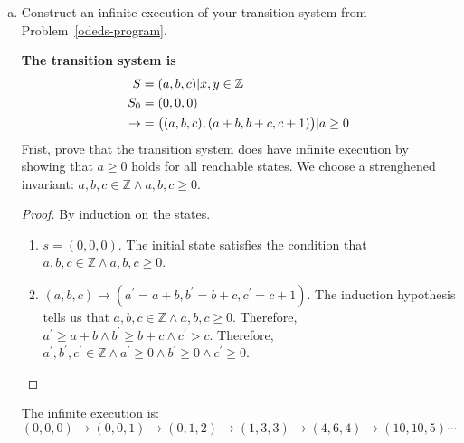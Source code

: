 \documentclass{article}
\begin{document}
\begin{enumerate}[leftmargin=*,itemindent=*,start=1,label={{\bf Problem \arabic*}.},ref=\arabic*]
\begin{enumerate}[(a)]
  \item Construct an infinite execution of your transition system from
    Problem~\ref{odeds-program}.

    \textbf{The transition system is}
    \begin{align*}
      S &= \set{(a,b,c) | x,y\in \mathbb{Z}}\\
      S_0 &= \set{(0, 0, 0)}\\
      \to &= \Set{\big((a,b,c),(a+b,b+c,c+1)\big) | a \geq 0}
    \end{align*}
    Frist, prove that the transition system does have infinite execution by showing that $a \geq 0$ holds for all reachable states. We choose a strenghened invariant: $a, b, c\in \mathbb{Z} \wedge a, b, c \geq 0$.
    \begin{proof}
      By induction on the states.
      \begin{enumerate}
        \item $s=(0, 0, 0)$. The initial state satisfies the condition that $a, b, c\in \mathbb{Z} \wedge a, b, c \geq 0$.
        \item $(a, b, c)\to (a^\prime=a+b, b^\prime=b+c, c^\prime=c+1)$. The induction hypothesis tells us that $a, b, c\in \mathbb{Z} \wedge a, b, c \geq 0$. Therefore, $a^\prime\geq a+b\wedge b^\prime\geq b+c \wedge c^\prime > c$. Therefore, $a^\prime, b^\prime, c^\prime \in \mathbb{Z}\wedge a^\prime \geq 0 \wedge b^\prime\geq 0\wedge c^\prime\geq 0$.
      \end{enumerate}
    \end{proof}
    The infinite execution is:
    $$(0, 0, 0)\to(0, 0, 1)\to(0, 1, 2)\to(1, 3, 3)\to(4, 6, 4)\to(10, 10, 5)\cdots$$


\end{enumerate}
\end{enumerate}
\end{document}

